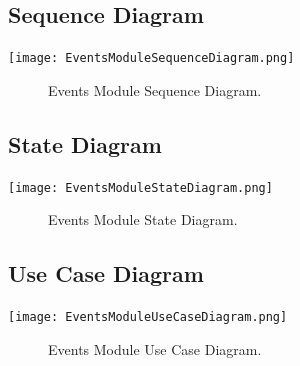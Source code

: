 \documentclass[12pt]{article}
\begin{document}
    \subsection{Sequence Diagram}
        \texttt{[image: EventsModuleSequenceDiagram.png]}
        \begin{figure}[h]
            \caption{Events Module Sequence Diagram.}
        \end{figure}

	
	\subsection{State Diagram}
       \texttt{[image: EventsModuleStateDiagram.png]}
        \begin{figure}[h]
        	\caption{Events Module State Diagram.}
        \end{figure}
	
	\subsection{Use Case Diagram}
        	\texttt{[image: EventsModuleUseCaseDiagram.png]}
        	\begin{figure}[h]
        		\caption{Events Module Use Case Diagram.}
        	\end{figure}
   
\end{document}
